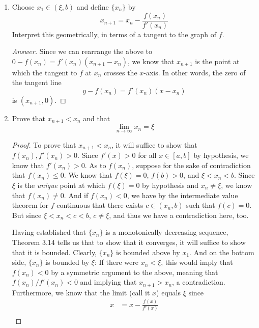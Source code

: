 \documentclass[../psets.tex]{subfiles}
\begin{document}
\begin{enumerate}[label={\textbf{\arabic*.}}]
    \begin{enumerate}
        \item Choose $x_1\in(\xi,b)$ and define $\{x_n\}$ by
        \begin{equation*}
            x_{n+1} = x_n-\frac{f(x_n)}{f'(x_n)}
        \end{equation*}
        Interpret this geometrically, in terms of a tangent to the graph of $f$.
        \begin{proof}[Answer]
            Since we can rearrange the above to $0-f(x_n)=f'(x_n)(x_{n+1}-x_n)$, we know that $x_{n+1}$ is the point at which the tangent to $f$ at $x_n$ crosses the $x$-axis. In other words, the zero of the tangent line
            \begin{equation*}
                y-f(x_n) = f'(x_n)(x-x_n)
            \end{equation*}
            is $(x_{n+1},0)$.
        \end{proof}
        \item Prove that $x_{n+1}<x_n$ and that
        \begin{equation*}
            \lim_{n\to\infty}x_n = \xi
        \end{equation*}
        \begin{proof}
            To prove that $x_{n+1}<x_n$, it will suffice to show that $f(x_n),f'(x_n)>0$. Since $f'(x)>0$ for all $x\in[a,b]$ by hypothesis, we know that $f'(x_n)>0$. As to $f(x_n)$, suppose for the sake of contradiction that $f(x_n)\leq 0$. We know that $f(\xi)=0$, $f(b)>0$, and $\xi<x_n<b$. Since $\xi$ is the \emph{unique} point at which $f(\xi)=0$ by hypothesis and $x_n\neq\xi$, we know that $f(x_n)\neq 0$. And if $f(x_n)<0$, we have by the intermediate value theorem for $f$ continuous that there exists $c\in(x_n,b)$ such that $f(c)=0$. But since $\xi<x_n<c<b$, $c\neq\xi$, and thus we have a contradiction here, too.\par
            Having established that $\{x_n\}$ is a monotonically decreasing sequence, Theorem 3.14 tells us that to show that it converges, it will suffice to show that it is bounded. Clearly, $\{x_n\}$ is bounded above by $x_1$. And on the bottom side, $\{x_n\}$ is bounded by $\xi$: If there were $x_n<\xi$, this would imply that $f(x_n)<0$ by a symmetric argument to the above, meaning that $f(x_n)/f'(x_n)<0$ and implying that $x_{n+1}>x_n$, a contradiction. Furthermore, we know that the limit (call it $x$) equals $\xi$ since
            \begin{align*}
                x &= x-\frac{f(x)}{f'(x)}\\

\end{align*}
\end{proof}
\end{enumerate}
\end{enumerate}
\end{document}
